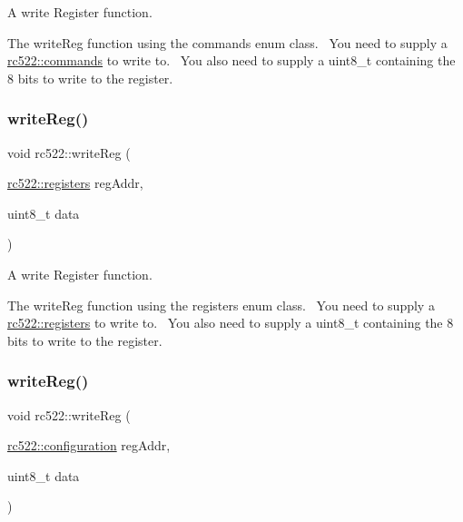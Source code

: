 A write Register function. 

The write\+Reg function using the commands enum class.~\newline
You need to supply a \hyperlink{classrc522_a6df2359c88d6c2f47faf58bc9e09eaa4}{rc522\+::commands} to write to.~\newline
You also need to supply a uint8\+\_\+t containing the 8 bits to write to the register.~\newline
 \mbox{\label{classrc522_aa8e748a997e22ef74e00c05f8d8383c5}} 
\subsubsection{\texorpdfstring{write\+Reg()}{writeReg()}\hspace{0.1cm}{\footnotesize\ttfamily [2/6]}}
{\footnotesize\ttfamily void rc522\+::write\+Reg (\begin{DoxyParamCaption}\item[{\hyperlink{classrc522_a83057db5f8fefa3dc9a6e8e5f0e191ee}{rc522\+::registers}}]{reg\+Addr,  }\item[{uint8\+\_\+t}]{data }\end{DoxyParamCaption})}



A write Register function. 

The write\+Reg function using the registers enum class.~\newline
You need to supply a \hyperlink{classrc522_a83057db5f8fefa3dc9a6e8e5f0e191ee}{rc522\+::registers} to write to.~\newline
You also need to supply a uint8\+\_\+t containing the 8 bits to write to the register.~\newline
 \mbox{\label{classrc522_a51979eca697dcfeddf2ef8795adf7851}} 
\subsubsection{\texorpdfstring{write\+Reg()}{writeReg()}\hspace{0.1cm}{\footnotesize\ttfamily [3/6]}}
{\footnotesize\ttfamily void rc522\+::write\+Reg (\begin{DoxyParamCaption}\item[{\hyperlink{classrc522_afcf27c8198d017cd4e8173c7d7a6fded}{rc522\+::configuration}}]{reg\+Addr,  }\item[{uint8\+\_\+t}]{data }\end{DoxyParamCaption})}




